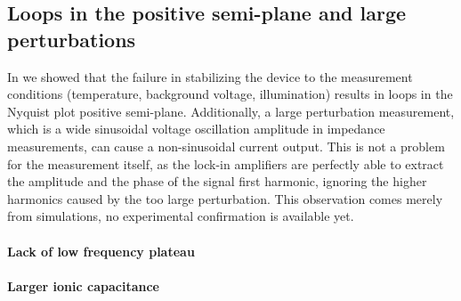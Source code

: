 \subsection{Loops in the positive semi-plane and large perturbations}\label{impedance-large_perturbations}
In  we showed that the failure in stabilizing the device to the measurement conditions (temperature, background voltage, illumination) results in loops in the Nyquist plot positive semi-plane.
Additionally, a large perturbation measurement, which is a wide sinusoidal voltage oscillation amplitude in impedance measurements, can cause a non-sinusoidal current output.
This is not a problem for the measurement itself, as the lock-in amplifiers are perfectly able to extract the amplitude and the phase of the signal first harmonic, ignoring the higher harmonics caused by the too large perturbation.
This observation comes merely from simulations, no experimental confirmation is available yet.

\begin{figure}
\end{figure}




\paragraph{Lack of low frequency plateau}

\paragraph{Larger ionic capacitance}


